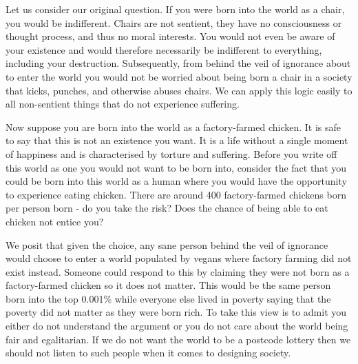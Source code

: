 Let us consider our original question. If you were born into the world as a chair, you would be indifferent. Chairs are not sentient, they have no consciousness or thought process, and thus no moral interests. You would not even be aware of your existence and would therefore necessarily be indifferent to everything, including your destruction. Subsequently, from behind the veil of ignorance about to enter the world you would not be worried about being born a chair in a society that kicks, punches, and otherwise abuses chairs. We can apply this logic easily to all non-sentient things that do not experience suffering.

Now suppose you are born into the world as a factory-farmed chicken. It is safe to say that this is not an existence you want. It is a life without a single moment of happiness and is characterised by torture and suffering. Before you write off this world as one you would not want to be born into, consider the fact that you could be born into this world as a human where you would have the opportunity to experience eating chicken. There are around 400 factory-farmed chickens born per person born - do you take the risk? Does the chance of being able to eat chicken not entice you?

We posit that given the choice, any sane person behind the veil of ignorance would choose to enter a world populated by vegans where factory farming did not exist instead. Someone could respond to this by claiming they were not born as a factory-farmed chicken so it does not matter. This would be the same person born into the top 0.001\% while everyone else lived in poverty saying that the poverty did not matter as they were born rich. To take this view is to admit you either do not understand the argument or you do not care about the world being fair and egalitarian. If we do not want the world to be a postcode lottery then we should not listen to such people when it comes to designing society.